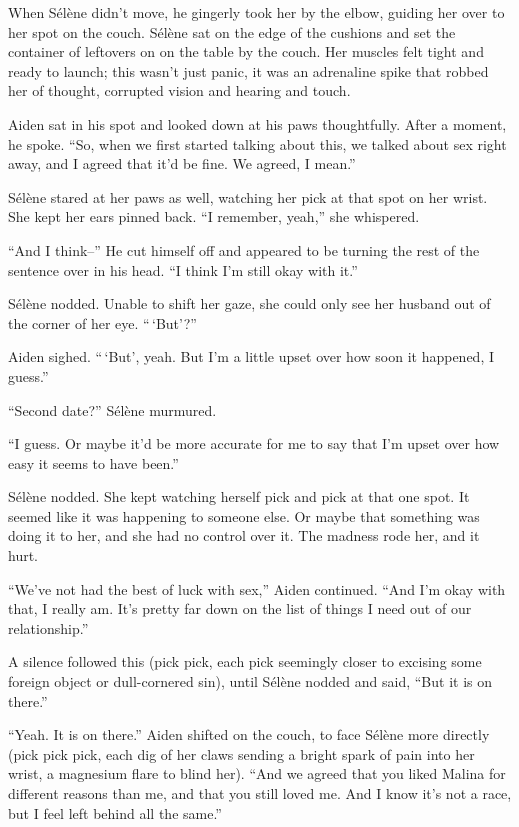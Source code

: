 When Sélène didn't move, he gingerly took her by the elbow, guiding her over to her spot on the couch. Sélène sat on the edge of the cushions and set the container of leftovers on on the table by the couch. Her muscles felt tight and ready to launch; this wasn't just panic, it was an adrenaline spike that robbed her of thought, corrupted vision and hearing and touch.

Aiden sat in his spot and looked down at his paws thoughtfully. After a moment, he spoke. ``So, when we first started talking about this, we talked about sex right away, and I agreed that it'd be fine. We agreed, I mean.''

Sélène stared at her paws as well, watching her pick at that spot on her wrist. She kept her ears pinned back. ``I remember, yeah,'' she whispered.

``And I think--'' He cut himself off and appeared to be turning the rest of the sentence over in his head. ``I think I'm still okay with it.''

Sélène nodded. Unable to shift her gaze, she could only see her husband out of the corner of her eye. ``\,`But'?''

Aiden sighed. ``\,`But', yeah. But I'm a little upset over how soon it happened, I guess.''

``Second date?'' Sélène murmured.

``I guess. Or maybe it'd be more accurate for me to say that I'm upset over how easy it seems to have been.''

Sélène nodded. She kept watching herself pick and pick at that one spot. It seemed like it was happening to someone else. Or maybe that something was doing it to her, and she had no control over it. The madness rode her, and it hurt.

``We've not had the best of luck with sex,'' Aiden continued. ``And I'm okay with that, I really am. It's pretty far down on the list of things I need out of our relationship.''

A silence followed this (pick pick, each pick seemingly closer to excising some foreign object or dull-cornered sin), until Sélène nodded and said, ``But it is on there.''

``Yeah. It is on there.'' Aiden shifted on the couch, to face Sélène more directly (pick pick pick, each dig of her claws sending a bright spark of pain into her wrist, a magnesium flare to blind her). ``And we agreed that you liked Malina for different reasons than me, and that you still loved me. And I know it's not a race, but I feel left behind all the same.''

